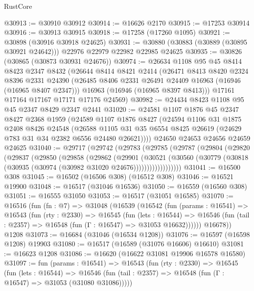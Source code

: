 \begin{lexlean}{RustCore}
\begin{coremodule}
@30913 := @30910 @30912
@30914 := @16626 @2170
@30915 := @17253 @30914
@30916 := @30913 @30915
@30918 := @17258 (@17260 @1095)
@30921 := @30898 (@30916 @30918 @24625)
@30931 := @30880 (@30883 (@30889 (@30895 @30921 @24642))) @22976 @22979 @22982 @22985 @24625
@30935 := @30826 (@30865 (@30873 @30931 @24676))
@30974 := @26634
    @1108
    @95
    @45
    @8414
    @8423
    @2347
    @8432
    (@26644
      @8414
      @8421
      @2414
      (@26471
        @8413
        @8420
        @2324
        @8396
        @2331
        @24390
        (@26485 @8406 @2331 @26491 @24409 @16963 (@16946 (@16965 @8407 @2347)))
        @16963
        (@16946 (@16965 @8397 @8413)))
      @17161
      @17164
      @17167
      @17171
      @17176
      @24569)
@30982 := @24434 @8423 @1108 @95 @45 @2347 @8429 @2347 @2441
@31020 := @24581
    @1107
    @1876
    @45
    @2347
    @8427
    @2368
    @1959
    (@24589
      @1107
      @1876
      @8427
      (@24594
        @1106
        @31
        @1875
        @2408
        @8426
        @24548
        (@26588 @1105 @31 @35 @6554 @8425 @26619 (@24629 @783 @31 @34 @2382 @6556 @24480 @26621))))
    @24650
    @24653
    @24656
    @24659
    @24625
@31040 := @29717
    (@29742
      (@29783
        (@29785
          (@29787
            (@29804
              (@29820
                (@29837
                  (@29850
                    (@29858
                      (@29862
                        (@29901
                          (@30521
                            (@30560
                              (@30779
                                (@30818 (@30935 (@30974 (@30982 @31020 @24676))))))))))))))))))
@31041 := @16500 @308
@31045 := @16502 (@16506 @308) (@16512 @308)
@31046 := @16521 @19900
@31048 := @16517 (@31046 @16536)
@31050 := @16559 (@16560 @308)
@31051 := @16555 @31050
@31053 := @16517 (@31051 @16585)
@31070 := @16516
    (fun (fn : @7) =>
    @31048
      (@16539
        (@16542
          (fun (params : @16541) =>
          @16543
            (fun (rty : @2330) =>
            @16545
              (fun (lets : @16544) =>
              @16546 (fun (tail : @2357) => @16548 (fun (Γ : @16547) => @31053 @16632))))))
        @16678))
    @1208
@31073 := @16684 (@31046 (@16534 @1208))
@31076 := @16597 (@16598 @1208) @19903
@31080 := @16517 (@16589 (@31076 @16606) @16610)
@31081 := @16623 @1208
@31086 := @16620 (@16622 @31081 @19906 @16578 @16580)
@31097 := fun (params : @16541) =>
  @16543
    (fun (rty : @2330) =>
    @16545
      (fun (lets : @16544) =>
      @16546 (fun (tail : @2357) => @16548 (fun (Γ : @16547) => @31053 (@31080 @31086)))))

\end{coremodule}
\end{lexlean}
